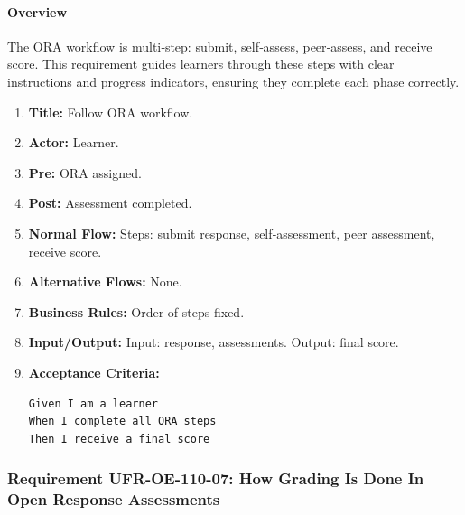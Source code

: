 \paragraph{Overview}
The ORA workflow is multi‑step: submit, self‑assess, peer‑assess, and receive score. This requirement guides learners through these steps with clear instructions and progress indicators, ensuring they complete each phase correctly.
\begin{enumerate}[label=\textbf{\arabic*.}]
\item \textbf{Title:} Follow ORA workflow.
\item \textbf{Actor:} Learner.
\item \textbf{Pre:} ORA assigned.
\item \textbf{Post:} Assessment completed.
\item \textbf{Normal Flow:} Steps: submit response, self‑assessment, peer assessment, receive score.
\item \textbf{Alternative Flows:} None.
\item \textbf{Business Rules:} Order of steps fixed.
\item \textbf{Input/Output:} Input: response, assessments. Output: final score.
\item \textbf{Acceptance Criteria:}
    \begin{verbatim}
Given I am a learner
When I complete all ORA steps
Then I receive a final score
    \end{verbatim}
\end{enumerate}

\subsubsection{Requirement UFR-OE-110-07: How Grading Is Done In Open Response Assessments}
